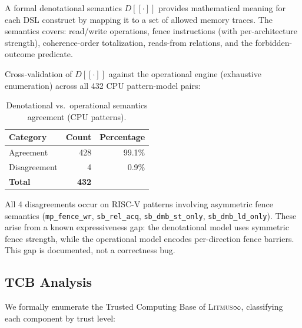 \documentclass[11pt]{article}
\newcommand{\litmus}{\textsc{Litmus$\infty$}}
\begin{document}
A formal denotational semantics $D[\![\cdot]\!]$ provides mathematical
meaning for each DSL construct by mapping it to a set of allowed
memory traces.  The semantics covers: read/write operations,
fence instructions (with per-architecture strength),
coherence-order totalization, reads-from relations, and
the forbidden-outcome predicate.

Cross-validation of $D[\![\cdot]\!]$ against the operational
engine (exhaustive enumeration) across all 432 CPU pattern-model pairs:

\begin{table}[ht]
\centering
\caption{Denotational vs.\ operational semantics agreement (CPU patterns).}
\label{tab:denotational-validation}
\small
\begin{tabular}{lrr}
\toprule
\textbf{Category} & \textbf{Count} & \textbf{Percentage} \\
\midrule
Agreement          & 428   & 99.1\% \\
Disagreement       & 4     & 0.9\% \\
\midrule
\textbf{Total}     & \textbf{432} & \\
\bottomrule
\end{tabular}
\end{table}

\noindent
All 4 disagreements occur on RISC-V patterns involving asymmetric
fence semantics (\texttt{mp\_fence\_wr}, \texttt{sb\_rel\_acq},
\texttt{sb\_dmb\_st\_only}, \texttt{sb\_dmb\_ld\_only}).  These
arise from a known expressiveness gap: the denotational model
uses symmetric fence strength, while the operational model
encodes per-direction fence barriers.  This gap is documented,
not a correctness bug.

\subsection{TCB Analysis}
\label{sec:tcb-analysis}

We formally enumerate the Trusted Computing Base of \litmus{},
classifying each component by trust level:
\end{document}
